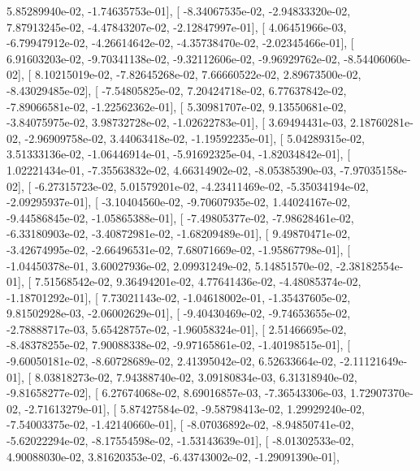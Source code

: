 \documentclass{article}
\begin{document}
          5.85289940e-02,  -1.74635753e-01],
       [ -8.34067535e-02,  -2.94833320e-02,   7.87913245e-02,
         -4.47843207e-02,  -2.12847997e-01],
       [  4.06451966e-03,  -6.79947912e-02,  -4.26614642e-02,
         -4.35738470e-02,  -2.02345466e-01],
       [  6.91603203e-02,  -9.70341138e-02,  -9.32112606e-02,
         -9.96929762e-02,  -8.54406060e-02],
       [  8.10215019e-02,  -7.82645268e-02,   7.66660522e-02,
          2.89673500e-02,  -8.43029485e-02],
       [ -7.54805825e-02,   7.20424718e-02,   6.77637842e-02,
         -7.89066581e-02,  -1.22562362e-01],
       [  5.30981707e-02,   9.13550681e-02,  -3.84075975e-02,
          3.98732728e-02,  -1.02622783e-01],
       [  3.69494431e-03,   2.18760281e-02,  -2.96909758e-02,
          3.44063418e-02,  -1.19592235e-01],
       [  5.04289315e-02,   3.51333136e-02,  -1.06446914e-01,
         -5.91692325e-04,  -1.82034842e-01],
       [  1.02221434e-01,  -7.35563832e-02,   4.66314902e-02,
         -8.05385390e-03,  -7.97035158e-02],
       [ -6.27315723e-02,   5.01579201e-02,  -4.23411469e-02,
         -5.35034194e-02,  -2.09295937e-01],
       [ -3.10404560e-02,  -9.70607935e-02,   1.44024167e-02,
         -9.44586845e-02,  -1.05865388e-01],
       [ -7.49805377e-02,  -7.98628461e-02,  -6.33180903e-02,
         -3.40872981e-02,  -1.68209489e-01],
       [  9.49870471e-02,  -3.42674995e-02,  -2.66496531e-02,
          7.68071669e-02,  -1.95867798e-01],
       [ -1.04450378e-01,   3.60027936e-02,   2.09931249e-02,
          5.14851570e-02,  -2.38182554e-01],
       [  7.51568542e-02,   9.36494201e-02,   4.77641436e-02,
         -4.48085374e-02,  -1.18701292e-01],
       [  7.73021143e-02,  -1.04618002e-01,  -1.35437605e-02,
          9.81502928e-03,  -2.06002629e-01],
       [ -9.40430469e-02,  -9.74653655e-02,  -2.78888717e-03,
          5.65428757e-02,  -1.96058324e-01],
       [  2.51466695e-02,  -8.48378255e-02,   7.90088338e-02,
         -9.97165861e-02,  -1.40198515e-01],
       [ -9.60050181e-02,  -8.60728689e-02,   2.41395042e-02,
          6.52633664e-02,  -2.11121649e-01],
       [  8.03818273e-02,   7.94388740e-02,   3.09180834e-03,
          6.31318940e-02,  -9.81658277e-02],
       [  6.27674068e-02,   8.69016857e-03,  -7.36543306e-03,
          1.72907370e-02,  -2.71613279e-01],
       [  5.87427584e-02,  -9.58798413e-02,   1.29929240e-02,
         -7.54003375e-02,  -1.42140660e-01],
       [ -8.07036892e-02,  -8.94850741e-02,  -5.62022294e-02,
         -8.17554598e-02,  -1.53143639e-01],
       [ -8.01302533e-02,   4.90088030e-02,   3.81620353e-02,
         -6.43743002e-02,  -1.29091390e-01],
\end{document}
